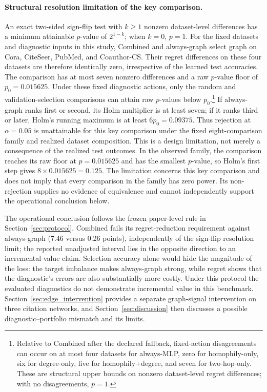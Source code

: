 \paragraph{Structural resolution limitation of the key comparison.}
An exact two-sided sign-flip test with $k\geq1$ nonzero dataset-level differences has a minimum attainable $p$-value of $2^{1-k}$; when $k=0$, $p=1$. For the fixed datasets and diagnostic inputs in this study, Combined and always-graph select graph on Cora, CiteSeer, PubMed, and Coauthor-CS. Their regret differences on these four datasets are therefore identically zero, irrespective of the learned test accuracies. The comparison has at most seven nonzero differences and a raw $p$-value floor of $p_0=0.015625$. Under these fixed diagnostic actions, only the random and validation-selection comparisons can attain raw $p$-values below $p_0$.\footnote{Relative to Combined after the declared fallback, fixed-action disagreements can occur on at most four datasets for always-MLP, zero for homophily-only, six for degree-only, five for homophily+degree, and seven for two-hop-only. These are structural upper bounds on nonzero dataset-level regret differences; with no disagreements, $p=1$.} If always-graph ranks first or second, its Holm multiplier is at least seven; if it ranks third or later, Holm's running maximum is at least $6p_0=0.09375$. Thus rejection at $\alpha=0.05$ is unattainable for this key comparison under the fixed eight-comparison family and realized dataset composition. This is a design limitation, not merely a consequence of the realized test outcomes. In the observed family, the comparison reaches its raw floor at $p=0.015625$ and has the smallest $p$-value, so Holm's first step gives $8\times0.015625=0.125$. The limitation concerns this key comparison and does not imply that every comparison in the family has zero power. Its non-rejection supplies no evidence of equivalence and cannot independently support the operational conclusion below.

The operational conclusion follows the frozen paper-level rule in Section~\ref{sec:protocol}. Combined fails its regret-reduction requirement against always-graph (7.46 versus 0.26 points), independently of the sign-flip resolution limit; the reported unadjusted interval lies in the opposite direction to an incremental-value claim. Selection accuracy alone would hide the magnitude of the loss: the target imbalance makes always-graph strong, while regret shows that the diagnostic's errors are also substantially more costly. Under this protocol the evaluated diagnostics do not demonstrate incremental value in this benchmark. Section~\ref{sec:edge_intervention} provides a separate graph-signal intervention on three citation networks, and Section~\ref{sec:discussion} then discusses a possible diagnostic--portfolio mismatch and its limits.
